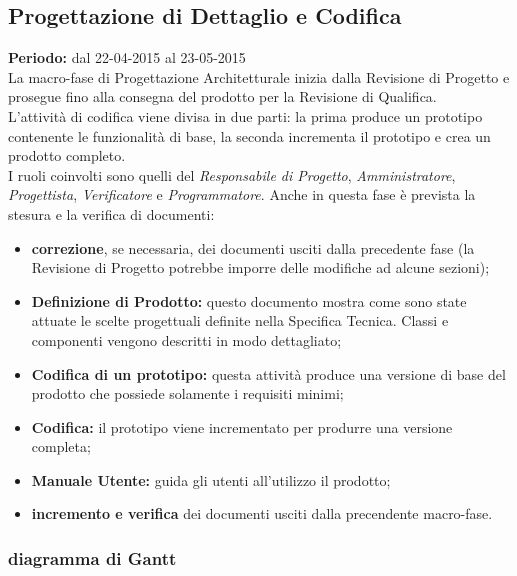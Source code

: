 \newpage
\subsection{Progettazione di Dettaglio e Codifica}
\textbf{Periodo:} dal 22-04-2015 al 23-05-2015 \\
La macro-fase di Progettazione Architetturale inizia dalla Revisione di Progetto e prosegue fino alla consegna del prodotto per la Revisione di Qualifica. \\
L'attività di codifica viene divisa in due parti: la prima produce un prototipo contenente le funzionalità di base, la seconda incrementa il prototipo e crea un prodotto completo. \\
I ruoli coinvolti sono quelli del \textit{Responsabile di Progetto}, \textit{Amministratore}, \textit{Progettista}, \textit{Verificatore} e \textit{Programmatore}.
Anche in questa fase è prevista la stesura e la verifica di documenti:
\begin{itemize}
\item \textbf{correzione}, se necessaria, dei documenti usciti dalla precedente fase (la Revisione di Progetto potrebbe imporre delle modifiche ad alcune sezioni);
\item \textbf{Definizione di Prodotto:} questo documento mostra come sono state attuate le scelte progettuali definite nella Specifica Tecnica. Classi e componenti vengono descritti in modo dettagliato;
\item \textbf{Codifica di un prototipo:} questa attività produce una versione di base del prodotto che possiede solamente i requisiti minimi;
\item \textbf{Codifica:} il prototipo viene incrementato per produrre una versione completa;
\item \textbf{Manuale Utente:} guida gli utenti all'utilizzo il prodotto;
\item \textbf{incremento e verifica} dei documenti usciti dalla precendente macro-fase.
\end{itemize}

\newpage
\subsubsection{diagramma di Gantt}

